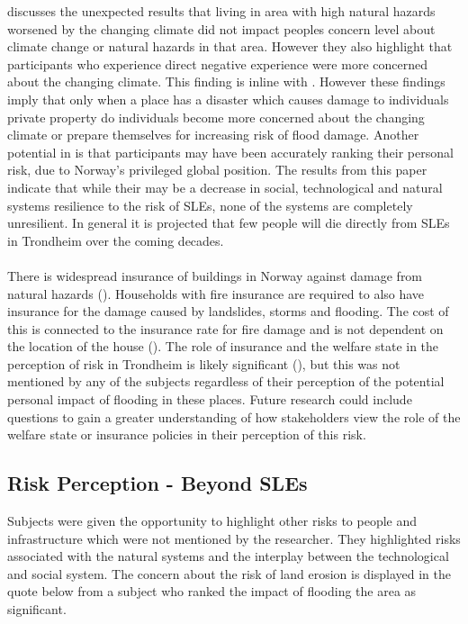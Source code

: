 
\cite{lujala_climate_2015} discusses the unexpected results that living in area with high natural hazards worsened by the changing climate did not impact peoples concern level about climate change or natural hazards in that area. However they also highlight that participants who experience direct negative experience were more concerned about the changing climate. This finding is inline with \cite{whitmarsh_are_2008}. However these findings imply that only when a place has a disaster which causes damage to individuals private property do individuals become more concerned about the changing climate or prepare themselves for increasing risk of flood damage. Another potential in \cite{lujala_climate_2015} is that participants may have been accurately ranking their personal risk, due to Norway's privileged global position. The results from this paper indicate that while their may be a decrease in social, technological and natural systems resilience to the risk of SLEs, none of the systems are completely unresilient. In general it is projected that few people will die directly from SLEs in Trondheim over the coming decades.
\paragraph{}


There is widespread insurance of buildings in Norway against damage from natural hazards (\cite{lujala_role_2020}). Households with fire insurance are required to also have insurance for the damage caused by landslides, storms and flooding. The cost of this is connected to the insurance rate for fire damage and is not dependent on the location of the house (\cite{lujala_role_2020}). The role of insurance and the welfare state in the perception of risk in Trondheim is likely significant (\cite{lujala_role_2020}), but this was not mentioned by any of the subjects regardless of their perception of the potential personal impact of flooding in these places. Future research could include questions to gain a greater understanding of how stakeholders view the role of the welfare state or insurance policies in their perception of this risk. 

\subsection{Risk Perception - Beyond SLEs}
Subjects were given the opportunity to highlight other risks to people and infrastructure which were not mentioned by the researcher. They highlighted risks associated with the natural systems and the interplay between the technological and social system. The concern about the risk of land erosion is displayed in the quote below from a subject who ranked the impact of flooding the area as significant.

